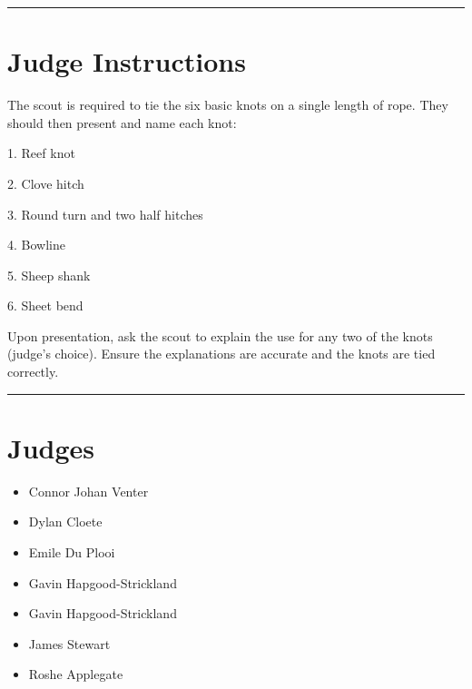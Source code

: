 \documentclass[10pt]{article}
\begin{document}
	\vspace{0.5cm}
	\hrule
	\vspace{0.5cm}

		\section*{Judge Instructions}
		The scout is required to tie the six basic knots on a single length of rope. They should then present and name each knot:

1. Reef knot

2. Clove hitch

3. Round turn and two half hitches

4. Bowline

5. Sheep shank

6. Sheet bend



Upon presentation, ask the scout to explain the use for any two of the knots (judge's choice). Ensure the explanations are accurate and the knots are tied correctly.


\vspace{0.5cm}
	\hrule
	\vspace{0.5cm}
		\section*{\faUsers \: Judges}

		

	\begin{multicols}{2}

		\begin{itemize}
									\item Connor Johan Venter
									\item Dylan Cloete
									\item Emile Du Plooi
									\item Gavin Hapgood-Strickland
						\end{itemize}

		\vfill\null
		\columnbreak

		\begin{itemize}
									\item Gavin Hapgood-Strickland
									\item James Stewart
									\item Roshe Applegate
						\end{itemize}

		\vfill\null

		\end{multicols}
\end{document}
